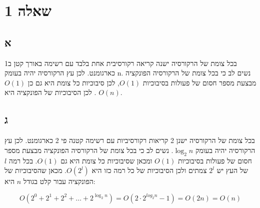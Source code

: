 \documentclass{article}
\begin{document}
\section*{שאלה 1}

\subsection*{א}

בכל צומת של הרקורסיה ישנה קריאה רקורסיבית אחת בלבד עם רשימה באורך קטן ב1 כארגומנט.
לכן עץ הרקורסיה יהיה בעומק n. 
נשים לב כי בכל צומת של הרקורסיה הפונקציה מבצעת מספר חסום של פעולות בסיבוכיות $O(1)$, לכן סיבוכיות כל צומת היא גם כן $O(1)$.
לכן הסיבוכיות של הפונקציה היא $O(n)$.
\\
 
\begin{center}
\end{center}

\subsection*{ג}

בכל צומת של הרקורסיה ישנן 2 קריאות רקורסיביות עם רשימה קטנה פי 2 כארגומנט.
לכן עץ הרקורסיה יהיה בעומק $\log_2{n}$.
נשים לב כי בכל צומת של הרקורסיה הפונקציה מבצעת מספר חסום של פעולות בסיבוכיות $O(1)$ ומכאן שסיבוכיות כל צומת היא גם $O(1)$.
בכל רמה $l$ של העץ יש $2^l$ צמתים ולכן הסיבוכיות של כל רמה כזו היא $O(2^l)$.
מכאן שהסיבוכיות של הפונקציה עבור קלט בגודל $n$ היא:

$$O(2^0 + 2^1 + 2^2 + \dots + 2^{\log_2{n}}) = O(2 \cdot 2^{log_2{n}} - 1) = O(2n) = O(n)$$
\end{document}
